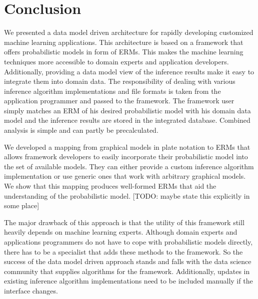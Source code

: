 \section{Conclusion}

We presented a data model driven architecture for rapidly developing customized machine learning applications. This architecture is based on a framework that offers probabilistic models in form of ERMs. This makes the machine learning techniques more accessible to domain experts and application developers. Additionally, providing a data model view of the inference results make it easy to integrate them into domain data. The responsibility of dealing with various inference algorithm implementations and file formats is taken from the application programmer and passed to the framework. The framework user simply matches an ERM of his desired probabilistic model with his domain data model and the inference results are stored in the integrated database. Combined analysis is simple and can partly be precalculated.

We developed a mapping from graphical models in plate notation to ERMs that allows framework developers to easily incorporate their probabilistic model into the set of available models. They can either provide a custom inference algorithm implementation or use generic ones that work with arbitrary graphical models. We show that this mapping produces well-formed ERMs that aid the understanding of the probabilistic model. [TODO: maybe state this explicitly in some place]

The major drawback of this approach is that the utility of this framework still heavily depends on machine learning experts. Although domain experts and applications programmers do not have to cope with probabilistic models directly, there has to be a specialist that adds these methods to the framework. So the success of the data model driven approach stands and falls with the data science community that supplies algorithms for the framework. Additionally, updates in existing inference algorithm implementations need to be included manually if the interface changes.

